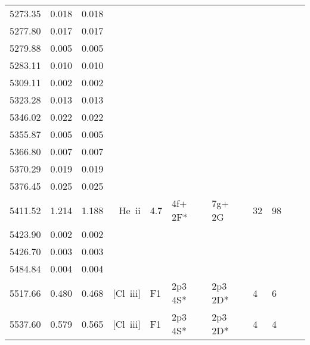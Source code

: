\begin{longtable}{lrlrlllllll}
 5273.35 &   0.018 &   0.018                                                                                      \\
 5277.80 &   0.017 &   0.017                                                                                      \\
 5279.88 &   0.005 &   0.005                                                                                      \\
 5283.11 &   0.010 &   0.010                                                                                      \\
 5309.11 &   0.002 &   0.002                                                                                      \\
 5323.28 &   0.013 &   0.013                                                                                      \\
 5346.02 &   0.022 &   0.022                                                                                      \\
 5355.87 &   0.005 &   0.005                                                                                      \\
 5366.80 &   0.007 &   0.007                                                                                      \\
 5370.29 &   0.019 &   0.019                                                                                      \\
 5376.45 &   0.025 &   0.025                                                                                      \\
 5411.52 &   1.214 &   1.188 &  He~{\sc ii}     &  4.7       &  4f+ 2F*   &  7g+ 2G    &         32 &       98    \\
 5423.90 &   0.002 &   0.002                                                                                      \\
 5426.70 &   0.003 &   0.003                                                                                      \\
 5484.84 &   0.004 &   0.004                                                                                      \\
 5517.66 &   0.480 &   0.468 &  [Cl~{\sc iii}]  &  F1        &  2p3 4S*   &  2p3 2D*   &          4 &        6    \\
 5537.60 &   0.579 &   0.565 &  [Cl~{\sc iii}]  &  F1        &  2p3 4S*   &  2p3 2D*   &          4 &        4    \\

\end{longtable}
